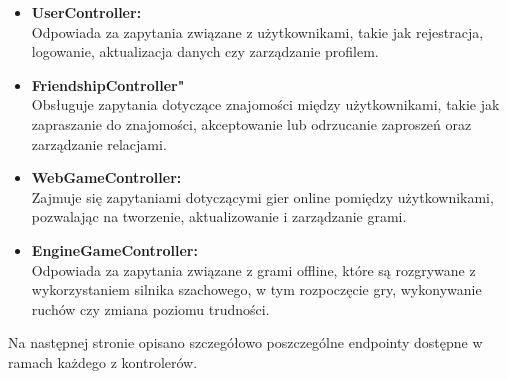 \documentclass[12pt,a4paper]{article}
\begin{document}
\begin{itemize}
    \item \textbf{UserController:}\\
    Odpowiada za zapytania związane z użytkownikami, takie jak rejestracja, logowanie, aktualizacja danych czy zarządzanie profilem.

    \item \textbf{FriendshipController"}\\
    Obsługuje zapytania dotyczące znajomości między użytkownikami, takie jak zapraszanie do znajomości, akceptowanie lub odrzucanie zaproszeń oraz zarządzanie relacjami.

    \item \textbf{WebGameController:}\\
    Zajmuje się zapytaniami dotyczącymi gier online pomiędzy użytkownikami, pozwalając na tworzenie, aktualizowanie i zarządzanie grami.

    \item \textbf{EngineGameController:}\\
    Odpowiada za zapytania związane z grami offline, które są rozgrywane z wykorzystaniem silnika szachowego, w tym rozpoczęcie gry, wykonywanie ruchów czy zmiana poziomu trudności.
\end{itemize}

\noindent
Na następnej stronie opisano szczegółowo poszczególne endpointy dostępne w ramach każdego z kontrolerów.

\newpage
\end{document}

